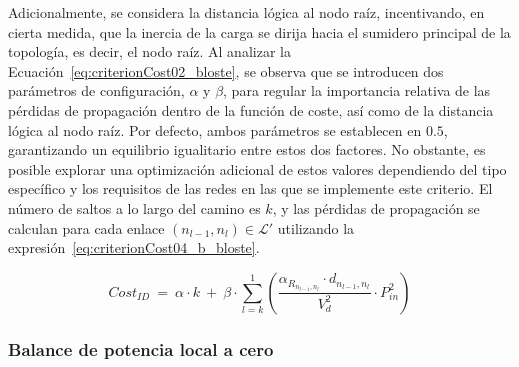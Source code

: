 Adicionalmente, se considera la distancia lógica al nodo raíz, incentivando, en cierta medida, que la inercia de la carga se dirija hacia el sumidero principal de la topología, es decir, el nodo raíz. Al analizar la Ecuación~\ref{eq:criterionCost02_bloste}, se observa que se introducen dos parámetros de configuración, $\alpha$ y $\beta$, para regular la importancia relativa de las pérdidas de propagación dentro de la función de coste, así como de la distancia lógica al nodo raíz. Por defecto, ambos parámetros se establecen en $0.5$, garantizando un equilibrio igualitario entre estos dos factores. No obstante, es posible explorar una optimización adicional de estos valores dependiendo del tipo específico y los requisitos de las redes en las que se implemente este criterio. El número de saltos a lo largo del camino es \( k \), y las pérdidas de propagación se calculan para cada enlace \( (n_{l-1}, n_l) \in \mathcal{L}' \) utilizando la expresión~\ref{eq:criterionCost04_b_bloste}.

\begin{equation}\label{eq:criterionCost02_bloste}
     Cost_{ID}  \: = \: \alpha \cdot k \: + \: \beta \cdot \sum_{l=k}^{1} \left( \frac{\alpha_{R_{n_{l-1},n_l}} \cdot d_{n_{l-1},n_l}}{V_{d}^{2}} \cdot P_{in}^{2} \right)
\end{equation}

\subsubsection{Balance de potencia local a cero}
\label{subsec:criteria_03}

